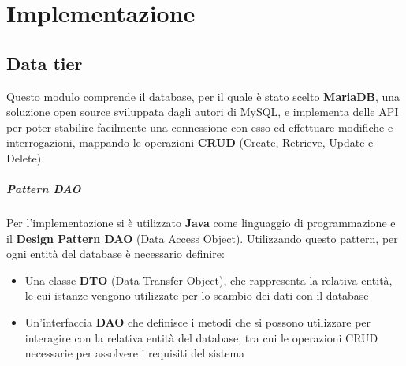 
\chapter{Implementazione}


\section{Data tier}
Questo modulo comprende il database, per il quale è stato scelto \textbf{MariaDB},
una soluzione open source sviluppata dagli autori di MySQL, e implementa delle
API per poter stabilire facilmente una connessione con esso ed effettuare
modifiche e interrogazioni, mappando le operazioni \textbf{CRUD} (Create, Retrieve,
Update e Delete).

\paragraph{Pattern DAO}
Per l'implementazione si è utilizzato \textbf{Java} come linguaggio di programmazione
e il \textbf{Design Pattern DAO} (Data Access Object). Utilizzando questo pattern,
per ogni entità del database è necessario definire:
\begin{itemize}
	\item Una classe \textbf{DTO} (Data Transfer Object), che rappresenta la
	relativa entità, le cui istanze vengono utilizzate per lo scambio dei dati
	con il database
	\item Un'interfaccia \textbf{DAO} che definisce i metodi che si possono
	utilizzare per interagire con la relativa entità del database, tra cui le
	operazioni CRUD necessarie per assolvere i requisiti del sistema
\end{itemize}


